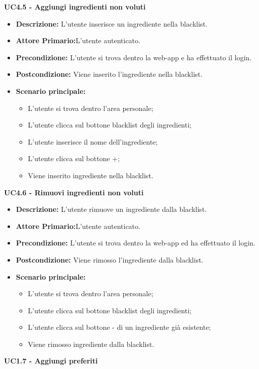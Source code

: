 \textbf{UC4.5 - Aggiungi ingredienti non voluti}
\begin{itemize}
    \item \textbf{Descrizione:} L'utente inserisce un ingrediente nella blacklist.
    \item \textbf{Attore Primario:}L'utente autenticato.
    \item \textbf{Precondizione:} L'utente si trova dentro la web-app e ha effettuato il login.
    \item \textbf{Postcondizione:} Viene inserito l'ingrediente nella blacklist.
    \item \textbf{Scenario principale:}
    \begin{itemize}
        \item L'utente si trova dentro l'area personale;
        \item L'utente clicca sul bottone blacklist degli ingredienti;
        \item L'utente inserisce il nome dell'ingrediente;
        \item L'utente clicca sul bottone +;
        \item Viene inserito ingrediente nella blacklist.
    \end{itemize}
\end{itemize}
\textbf{UC4.6 - Rimuovi ingredienti non voluti}
\begin{itemize}
    \item \textbf{Descrizione:} L'utente rimuove un ingrediente dalla blacklist.
    \item \textbf{Attore Primario:}L'utente autenticato.
    \item \textbf{Precondizione:} L'utente si trova dentro la web-app ed ha effettuato il login.
    \item \textbf{Postcondizione:} Viene rimosso l'ingrediente dalla blacklist.
    \item \textbf{Scenario principale:}
    \begin{itemize}
        \item L'utente si trova dentro l'area personale;
        \item L'utente clicca sul bottone blacklist degli ingredienti;
        \item L'utente clicca sul bottone - di un ingrediente già esistente;
        \item Viene rimosso ingrediente dalla blacklist.
    \end{itemize}
\end{itemize}
\textbf{UC1.7 - Aggiungi preferiti}

